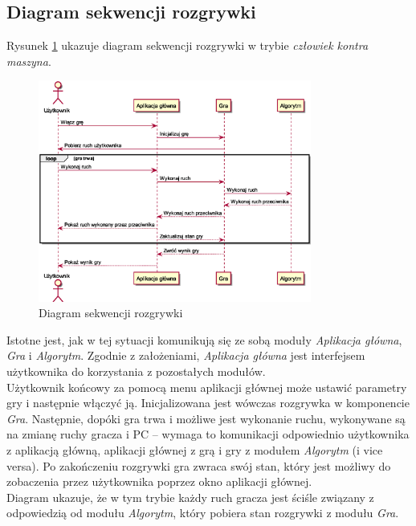 \documentclass{article}
\newcommand{\modulename}[1]{\textit{#1}}
\begin{document}
\subsection{Diagram sekwencji rozgrywki}
Rysunek \ref{rys:sequencegame} ukazuje diagram sekwencji rozgrywki w trybie \modulename{człowiek kontra maszyna}.
\begin{figure}[h]
	\centering
	\includegraphics[width=0.8\textwidth]{play_with_pc_sequence}
	\caption{Diagram sekwencji rozgrywki}
	\label{rys:sequencegame}
\end{figure}

\noindent Istotne jest, jak w tej sytuacji komunikują się ze sobą moduły \modulename{Aplikacja główna}, \modulename{Gra} i \modulename{Algorytm}. Zgodnie z założeniami, \modulename{Aplikacja główna} jest interfejsem użytkownika do korzystania z pozostałych modułów.\\

\noindent Użytkownik końcowy za pomocą menu aplikacji głównej może ustawić parametry gry i następnie włączyć ją. Inicjalizowana jest wówczas rozgrywka w komponencie \textit{Gra}. Następnie, dopóki gra trwa i możliwe jest wykonanie ruchu, wykonywane są na zmianę ruchy gracza i PC – wymaga to komunikacji odpowiednio użytkownika z aplikacją główną, aplikacji głównej z grą i gry z modułem \modulename{Algorytm} (i vice versa). Po zakończeniu rozgrywki gra zwraca swój stan, który jest możliwy do zobaczenia przez użytkownika poprzez okno aplikacji głównej.\\

\noindent Diagram ukazuje, że w tym trybie każdy ruch gracza jest ściśle związany z odpowiedzią od modułu \modulename{Algorytm}, który pobiera stan rozgrywki z modułu \modulename{Gra}.
\end{document}
